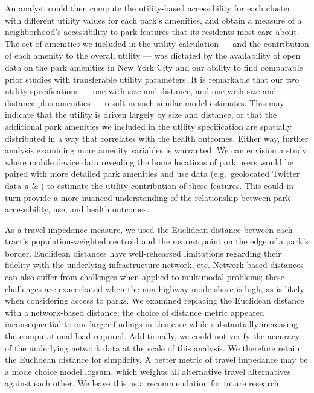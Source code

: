 \documentclass[Crown,sageh.bst]{sagej}
\begin{document}
An analyst could then compute the utility-based accessibility for each
cluster with different utility values for each park's amenities, and
obtain a measure of a neighborhood's accessibility to park features that
its residents most care about. The set of amenities we included in the
utility calculation --- and the contribution of each amenity to the
overall utility --- was dictated by the availability of open data on the
park amenities in New York City and our ability to find comparable prior
studies with transferable utility parameters. It is remarkable that our
two utility specifications --- one with size and distance, and one with
size and distance plus amenities --- result in such similar model
estimates. This may indicate that the utility is driven largely by size
and distance, or that the additional park amenities we included in the
utility specification are spatially distributed in a way that correlates
with the health outcomes. Either way, further analysis examining more
amenity variables is warranted. We can envision a study where mobile
device data revealing the home locations of park users would be paired
with more detailed park amenities and use data (e.g.~geolocated Twitter
data \emph{a la} \citet{roberts2017using}) to estimate the utility
contribution of these features. This could in turn provide a more
nuanced understanding of the relationship between park accessibility,
use, and health outcomes.

As a travel impedance measure, we used the Euclidean distance between
each tract's population-weighted centroid and the nearest point on the
edge of a park's border. Euclidean distances have well-rehearsed
limitations regarding their fidelity with the underlying infrastructure
network, etc. Network-based distances can also suffer from challenges
when applied to multimodal problems; these challenges are exacerbated
when the non-highway mode share is high, as is likely when considering
access to parks. We examined replacing the Euclidean distance with a
network-based distance; the choice of distance metric appeared
inconsequential to our larger findings in this case while substantially
increasing the computational load required. Additionally, we could not
verify the accuracy of the underlying network data at the scale of this
analysis. We therefore retain the Euclidean distance for simplicity. A
better metric of travel impedance may be a mode choice model logsum,
which weights all alternative travel alternatives against each other. We
leave this as a recommendation for future research.
\end{document}
